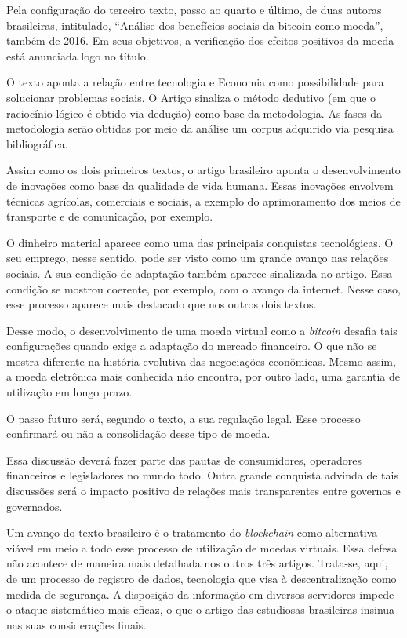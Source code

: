 \documentclass[12pt]{article}
\begin{document}
Pela configuração do terceiro texto, passo ao quarto e último, de duas autoras brasileiras, intitulado, “Análise dos benefícios sociais da bitcoin como moeda”, também de 2016. Em seus objetivos, a verificação dos efeitos positivos da moeda está anunciada logo no título.

O texto aponta a relação entre tecnologia e Economia como possibilidade para solucionar problemas sociais. O Artigo sinaliza o método dedutivo (em que o raciocínio lógico é obtido via dedução) como base da metodologia. As fases da metodologia serão obtidas por meio da análise um corpus adquirido via pesquisa bibliográfica.

Assim como os dois primeiros textos, o artigo brasileiro aponta o desenvolvimento de inovações como base da qualidade de vida humana. Essas inovações envolvem técnicas agrícolas, comerciais e sociais, a exemplo do aprimoramento dos meios de transporte e de comunicação, por exemplo.

O dinheiro material aparece como uma das principais conquistas tecnológicas. O seu emprego, nesse sentido, pode ser visto como um grande avanço nas relações sociais. A sua condição de adaptação também aparece sinalizada no artigo. Essa condição se mostrou coerente, por exemplo, com o avanço da internet. Nesse caso, esse processo aparece mais destacado que nos outros dois textos.

Desse modo, o desenvolvimento de uma moeda virtual como a \textit{bitcoin} desafia tais configurações quando exige a adaptação do mercado financeiro. O que não se mostra diferente na história evolutiva das negociações econômicas. Mesmo assim, a moeda eletrônica mais conhecida não encontra, por outro lado, uma garantia de utilização em longo prazo. 

O passo futuro será, segundo o texto, a sua regulação legal. Esse processo confirmará ou não a consolidação desse tipo de moeda.

Essa discussão deverá fazer parte das pautas de consumidores, operadores financeiros e legisladores no mundo todo. Outra grande conquista advinda de tais discussões será o impacto positivo de relações mais transparentes entre governos e governados.

Um avanço do texto brasileiro é o tratamento do \textit{blockchain} como alternativa viável em meio a todo esse processo de utilização de moedas virtuais. Essa defesa não acontece de maneira mais detalhada nos outros três artigos. Trata-se, aqui, de um processo de registro de dados, tecnologia que visa à descentralização como medida de segurança. A disposição da informação em diversos servidores impede o ataque sistemático mais eficaz, o que o artigo das estudiosas brasileiras insinua nas suas considerações finais.
\end{document}
